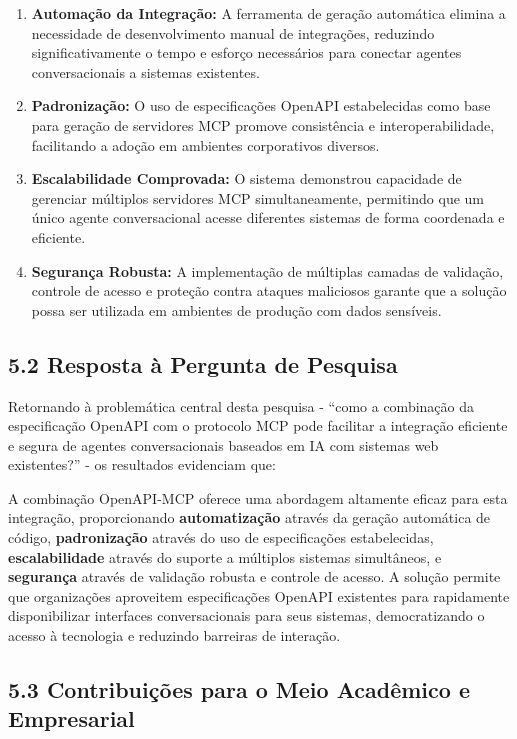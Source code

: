 \documentclass[
]{article}
\begin{document}
\begin{enumerate}
\def\labelenumi{\arabic{enumi}.}
\item
  \textbf{Automação da Integração:} A ferramenta de geração automática
  elimina a necessidade de desenvolvimento manual de integrações,
  reduzindo significativamente o tempo e esforço necessários para
  conectar agentes conversacionais a sistemas existentes.
\item
  \textbf{Padronização:} O uso de especificações OpenAPI estabelecidas
  como base para geração de servidores MCP promove consistência e
  interoperabilidade, facilitando a adoção em ambientes corporativos
  diversos.
\item
  \textbf{Escalabilidade Comprovada:} O sistema demonstrou capacidade de
  gerenciar múltiplos servidores MCP simultaneamente, permitindo que um
  único agente conversacional acesse diferentes sistemas de forma
  coordenada e eficiente.
\item
  \textbf{Segurança Robusta:} A implementação de múltiplas camadas de
  validação, controle de acesso e proteção contra ataques maliciosos
  garante que a solução possa ser utilizada em ambientes de produção com
  dados sensíveis.
\end{enumerate}

\subsection{5.2 Resposta à Pergunta de
Pesquisa}\label{resposta-uxe0-pergunta-de-pesquisa}

Retornando à problemática central desta pesquisa - ``como a combinação
da especificação OpenAPI com o protocolo MCP pode facilitar a integração
eficiente e segura de agentes conversacionais baseados em IA com
sistemas web existentes?'' - os resultados evidenciam que:

A combinação OpenAPI-MCP oferece uma abordagem altamente eficaz para
esta integração, proporcionando \textbf{automatização} através da
geração automática de código, \textbf{padronização} através do uso de
especificações estabelecidas, \textbf{escalabilidade} através do suporte
a múltiplos sistemas simultâneos, e \textbf{segurança} através de
validação robusta e controle de acesso. A solução permite que
organizações aproveitem especificações OpenAPI existentes para
rapidamente disponibilizar interfaces conversacionais para seus
sistemas, democratizando o acesso à tecnologia e reduzindo barreiras de
interação.

\subsection{5.3 Contribuições para o Meio Acadêmico e
Empresarial}\label{contribuiuxe7uxf5es-para-o-meio-acaduxeamico-e-empresarial}
\end{document}
